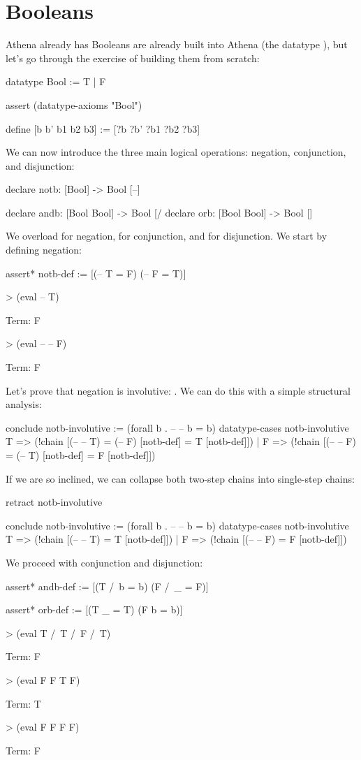 \section{Booleans}
Athena already has 
Booleans are already built into Athena (the datatype ), but let's go through the exercise 
of building them from scratch:
\begin{tcAthena}
datatype Bool := T | F

assert (datatype-axioms "Bool")

define [b b' b1 b2 b3] := [?b ?b' ?b1 ?b2 ?b3]
\end{tcAthena}
We can now introduce the three main logical operations: negation, conjunction, and disjunction:
\begin{tcAthena}
declare notb: [Bool] -> Bool [--]

declare andb: [Bool Bool] -> Bool [/\]
declare orb:  [Bool Bool] -> Bool [\/]
\end{tcAthena}
We overload \smtt{--} for negation, \smtt{/} for conjunction, and  for disjunction. We start by defining negation:
\begin{tcAthena}
assert* notb-def := [(-- T = F) 
                     (-- F = T)]                                         

> (eval -- T)

Term: F

> (eval -- -- F)

Term: F
\end{tcAthena}
Let's prove that negation is involutive: . We can do this with a simple structural analysis:
\begin{tcAthena}
conclude notb-involutive := (forall b . -- -- b = b)
  datatype-cases notb-involutive {
    T => (!chain [(-- -- T) = (-- F) [notb-def]
                            = T      [notb-def]])
  | F => (!chain [(-- -- F) = (-- T) [notb-def]
                            = F      [notb-def]])
  }
\end{tcAthena}
If we are so inclined, we can collapse both two-step chains into single-step chains:
\begin{tcAthena}
retract notb-involutive 

conclude notb-involutive := (forall b . -- -- b = b)
  datatype-cases notb-involutive {
    T => (!chain [(-- -- T) = T [notb-def]])
  | F => (!chain [(-- -- F) = F [notb-def]])
  }
\end{tcAthena}
We proceed with conjunction and disjunction:   
\begin{tcAthena}
assert* andb-def := [(T /\ b = b)
                     (F /\ _ = F)]

assert* orb-def := [(T \/ _ = T)
                    (F \/ b = b)]

> (eval T /\ T /\ F /\ T)

Term: F

> (eval F \/ F \/ T \/ F)

Term: T

> (eval F \/ F \/ F \/ F)

Term: F
\end{tcAthena}
